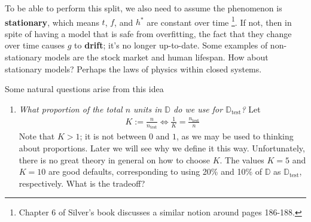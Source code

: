 \documentclass[12pt, a4paper]{article}
\theoremstyle{definition}
\begin{document}
	To be able to perform this split, we also need to assume the phenomenon is
	\textbf{stationary}, which means $t$, $f$, and $h^*$ are constant over time
	\footnote{Chapter 6 of Silver's book discusses a similar notion around pages 186-188.}.
	If not, then in spite of having a model that is safe from overfitting, the fact
	that they change over time causes $g$ to \textbf{drift}; it's no longer up-to-date.
	Some examples of non-stationary models are the stock market and human lifespan.
	How about stationary models? Perhaps the laws of physics within closed systems.
	
	Some natural questions arise from this idea
	\begin{enumerate}[label=(\arabic*)]
		\item \textit{What proportion of the total $n$ units in $\mathbb{D}$ do
		we use for $\mathbb{D}_{\text{test}}$?} Let
		\begin{align*}
			K:=\frac{n}{n_{\text{test}}} \iff \frac{1}{K} = \frac{n_{\text{test}}}{n}
		\end{align*}
		Note that $K>1$; it is not between $0$ and $1$, as we may be used to thinking
		about proportions. Later we will see why we define it this way. Unfortunately,
		there is no great theory in general on how to choose $K$. The values $K=5$ and
		$K=10$ are good defaults, corresponding to using 20\% and 10\% of $\mathbb{D}$
		as $\mathbb{D}_{\text{test}}$, respectively. What is the tradeoff?
		

\end{enumerate}
\end{document}
